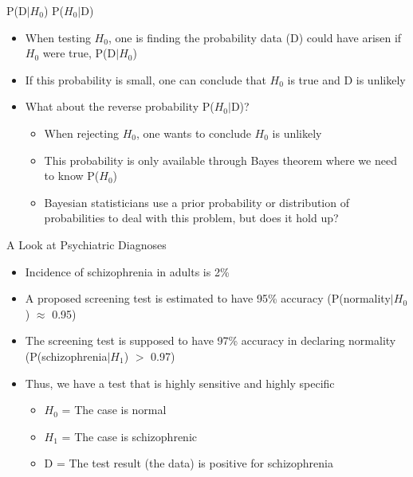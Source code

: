 \documentclass[aspectratio=169, 12pt]{beamer}
\begin{document}
\begin{frame}{P(D$|$$H_0$) \neq P($H_0$$|$D)}
  \begin{itemize}
  \item When testing $H_0$, one is finding the probability data (D) could have arisen if $H_0$ were true, P(D$|$$H_0$)
  \item If this probability is small, one can conclude that $H_0$ is true and D is unlikely
  \item What about the reverse probability P($H_0$$|$D)?
    \begin{itemize}
    \item When rejecting $H_0$, one wants to conclude $H_0$ is unlikely
    \item This probability is only available through Bayes theorem where we need to know P($H_0$)
    \item Bayesian statisticians use a prior probability or distribution of probabilities to deal with this problem, but does it hold up?
    \end{itemize}
  \end{itemize}
\end{frame}

\begin{frame}{A Look at Psychiatric Diagnoses}
  \begin{itemize}
  \item Incidence of schizophrenia in adults is 2\%\
  \item A proposed screening test is estimated to have 95\% accuracy (P(normality$|$$H_0$) \(\approx\) 0.95)
  \item The screening test is supposed to have 97\% accuracy in declaring normality (P(schizophrenia$|$$H_1$) \(>\) 0.97)
  \item Thus, we have a test that is highly sensitive and highly specific
    \begin{itemize}
    \item $H_0$ = The case is normal
    \item $H_1$ = The case is schizophrenic
    \item D = The test result (the data) is positive for schizophrenia
    \end{itemize}
  \end{itemize}
\end{frame}
\end{document}
